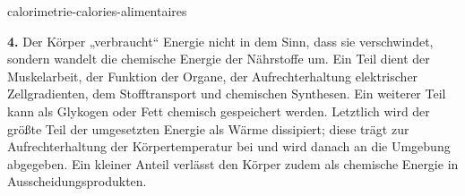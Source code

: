 \begin{exo}{calorimetrie-calories-alimentaires}
\begin{solution}
\textbf{4.} Der Körper „verbraucht“ Energie nicht in dem Sinn, dass sie verschwindet, sondern wandelt die chemische Energie der Nährstoffe um. Ein Teil dient der Muskelarbeit, der Funktion der Organe, der Aufrechterhaltung elektrischer Zellgradienten, dem Stofftransport und chemischen Synthesen. Ein weiterer Teil kann als Glykogen oder Fett chemisch gespeichert werden. Letztlich wird der größte Teil der umgesetzten Energie als Wärme dissipiert; diese trägt zur Aufrechterhaltung der Körpertemperatur bei und wird danach an die Umgebung abgegeben. Ein kleiner Anteil verlässt den Körper zudem als chemische Energie in Ausscheidungsprodukten.
\end{solution}
\end{exo}
